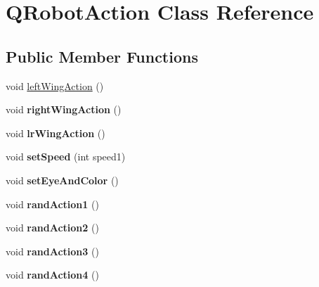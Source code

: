 \hypertarget{classQRobotAction}{\section{\-Q\-Robot\-Action \-Class \-Reference}
\label{classQRobotAction}
}
\subsection*{\-Public \-Member \-Functions}
\begin{DoxyCompactItemize}
\item 
void \hyperlink{classQRobotAction_a267b948c1f7fbfdafe350145a01e3d54}{left\-Wing\-Action} ()
\item 
\hypertarget{classQRobotAction_a3401dfd03980375edc9f9ecda8ca29c2}{void {\bfseries right\-Wing\-Action} ()}\label{classQRobotAction_a3401dfd03980375edc9f9ecda8ca29c2}

\item 
\hypertarget{classQRobotAction_abc54b66570f0b8dc6f2da85b518fb1b6}{void {\bfseries lr\-Wing\-Action} ()}\label{classQRobotAction_abc54b66570f0b8dc6f2da85b518fb1b6}

\item 
\hypertarget{classQRobotAction_a2789fc891ac5d513a458300b07bae348}{void {\bfseries set\-Speed} (int speed1)}\label{classQRobotAction_a2789fc891ac5d513a458300b07bae348}

\item 
\hypertarget{classQRobotAction_abaa9525e4a80d11de64c059a01094f19}{void {\bfseries set\-Eye\-And\-Color} ()}\label{classQRobotAction_abaa9525e4a80d11de64c059a01094f19}

\item 
\hypertarget{classQRobotAction_a6d47b54710f29f258f4abad503a759c0}{void {\bfseries rand\-Action1} ()}\label{classQRobotAction_a6d47b54710f29f258f4abad503a759c0}

\item 
\hypertarget{classQRobotAction_a27e994d0b8c3db21e4f39f6c483e6a7b}{void {\bfseries rand\-Action2} ()}\label{classQRobotAction_a27e994d0b8c3db21e4f39f6c483e6a7b}

\item 
\hypertarget{classQRobotAction_a4ae2d688eb5444141568ea493bdea9d5}{void {\bfseries rand\-Action3} ()}\label{classQRobotAction_a4ae2d688eb5444141568ea493bdea9d5}

\item 
\hypertarget{classQRobotAction_a28f4a84ae22e1ea4e09715ded26bf98a}{void {\bfseries rand\-Action4} ()}\label{classQRobotAction_a28f4a84ae22e1ea4e09715ded26bf98a}


\end{DoxyCompactItemize}
